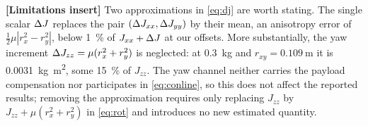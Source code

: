 \textbf{[Limitations insert]} Two approximations in \eqref{eq:dj} are worth stating. The
single scalar $\Delta J$ replaces the pair $(\Delta J_{xx}, \Delta J_{yy})$ by their mean, an anisotropy
error of $\tfrac12 \mu |r_x^2 - r_y^2|$, below \SI{1}{\percent} of $J_{xx}+\Delta J$ at our offsets.
More substantially, the yaw increment $\Delta J_{zz} = \mu(r_x^2 + r_y^2)$ is neglected: at
\SI{0.3}{\kg} and $r_{xy} = \SI{0.109}{\meter}$ it is \SI{0.0031}{\kg\meter\squared}, some
\SI{15}{\percent} of $J_{zz}$. The yaw channel neither carries the payload compensation nor
participates in \eqref{eq:conline}, so this does not affect the reported results; removing the
approximation requires only replacing $J_{zz}$ by $J_{zz} + \mu(r_x^2+r_y^2)$ in
\eqref{eq:rot} and introduces no new estimated quantity.
